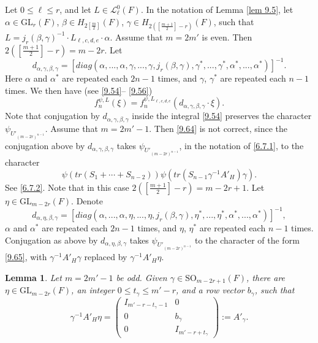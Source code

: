 \documentclass[12pts]{amsart}
\newcommand{\GL}{{\mathrm{GL}}}
\newcommand{\SO}{{\mathrm{SO}}}
\newtheorem{lem}[thm]{Lemma}
\begin{document}
Let $0\leq \ell\leq r$, and let $L\in\mathcal{L}^0_\ell(F)$. In the notation of Lemma \ref{lem 9.5}, let $\alpha\in \GL_r(F)$, $\beta\in H_{2[\frac{m}{2}]}(F)$, $\gamma\in H_{2([\frac{m+1}{2}]-r)}(F)$, such that $L=j_r(\beta,\gamma)^{-1}\cdot L_{\ell,c,d,e}\cdot \alpha$. Assume that $m=2m'$ is even. Then $2([\frac{m+1}{2}]-r)=m-2r$. Let
\begin{equation}\label{9.64.1}
d_{\alpha,\gamma,\beta,\gamma}=[diag(\alpha,...,\alpha,\gamma,...,\gamma,j_r(\beta,\gamma),\gamma^*,...,\gamma^*,\alpha^*,...,\alpha^*)]^{-1}.
\end{equation}
Here $\alpha$ and $\alpha^*$ are repeated each $2n-1$ times, and $\gamma$, $\gamma^*$ are repeated each $n-1$ times. We then have (see \eqref{9.54}-- \eqref{9.56})
\begin{equation}\label{9.64}
f_n^{\psi,L}(\xi)=f_n^{\psi,L_{\ell,c,d,e}}(d_{\alpha,\gamma,\beta,\gamma}\cdot\xi).
\end{equation}
Note that conjugation by $d_{\alpha,\gamma,\beta,\gamma}$ inside the integral \eqref{9.54} preserves the character $\psi_{U'_{(m-2r)^{n-1}}}$. Assume that $m=2m'-1$. Then \eqref{9.64} is not correct, since the conjugation above by $d_{\alpha,\gamma,\beta,\gamma}$ takes $\psi_{U'_{(m-2r)^{n-1}}}$, in the notation of \eqref{6.7.1}, to the character
\begin{equation}\label{9.65}
	\psi(tr(S_1+\cdots+S_{n-2}))\psi(tr(S_{n-1}\gamma^{-1}A'_H)\gamma).
\end{equation}
See \eqref{6.7.2}. Note that in this case $2([\frac{m+1}{2}]-r)=m-2r+1$. Let $\eta\in \GL_{m-2r}(F)$. Denote
\begin{equation}\label{9.65.1}
d_{\alpha,\eta,\beta,\gamma}=[diag(\alpha,...,\alpha,\eta,...,\eta,j_r(\beta,\gamma),\eta^*,...,\eta^*,\alpha^*,...,\alpha^*)]^{-1},
\end{equation}
$\alpha$ and $\alpha^*$ are repeated each $2n-1$ times, and $\eta$, $\eta^*$ are repeated each $n-1$ times. Conjugation as above by $d_{\alpha,\eta,\beta,\gamma}$ takes $\psi_{U'_{(m-2r)^{n-1}}}$ to the character of the form \eqref{9.65}, with $\gamma^{-1}A'_H\gamma$ replaced by $\gamma^{-1}A'_H\eta$.
\begin{lem}\label{lem 9.6}
Let $m=2m'-1$ be odd. Given $\gamma\in \SO_{m-2r+1}(F)$, there are $\eta\in \GL_{m-2r}(F)$, an integer $0\leq t_\gamma\leq m'-r$, and a row vector $b_\gamma$, such that
$$
\gamma^{-1}A'_H\eta=\begin{pmatrix}I_{m'-r-t_\gamma-1}&0\\0&b_\gamma\\0&I_{m'-r+t_\gamma}\end{pmatrix}:=A'_\gamma.
$$ 
\end{lem}
\end{document}
